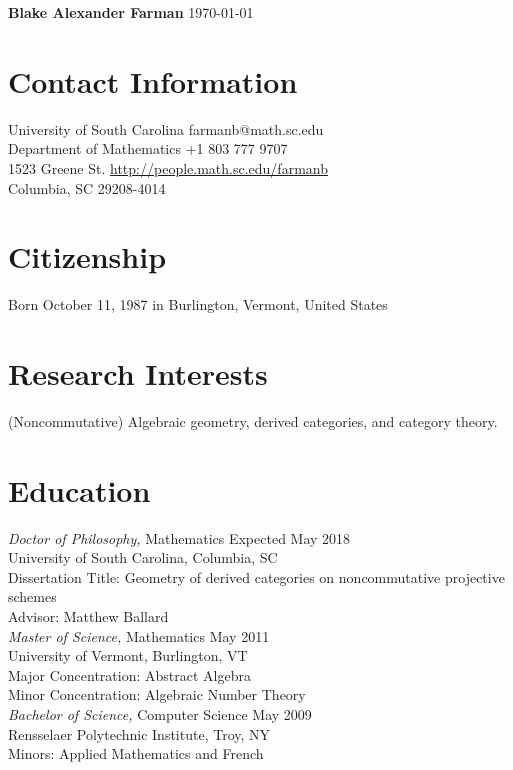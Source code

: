 \documentclass{article}
\begin{document}
\noindent\textbf{\large{Blake Alexander Farman}} \hfill \today\\
\noindent\makebox[\linewidth]{\rule{\textwidth}{0.4pt}}

\section*{Contact Information}
  University of South Carolina \hfill farmanb@math.sc.edu\\
  Department of Mathematics \hfill +1 803 777 9707\\
  1523 Greene St. \hfill \hyperref[http://people.math.sc.edu/farmanb]{http://people.math.sc.edu/farmanb}\\
  Columbia, SC 29208-4014

  \section*{Citizenship}
  Born October 11, 1987 in Burlington, Vermont, United States

  \section*{Research Interests}
  (Noncommutative) Algebraic geometry, derived categories, and category theory.
  
  \section*{Education} 
  \textsl{Doctor of Philosophy,} Mathematics \hfill Expected May 2018\\
  University of South Carolina, Columbia, SC\\
  Dissertation Title: Geometry of derived categories on noncommutative projective schemes\\
  Advisor: Matthew Ballard\\
  
  \noindent
  \textsl{Master of Science,} Mathematics \hfill May 2011\\
  University of Vermont, Burlington, VT\\
  Major Concentration: Abstract Algebra\\
  Minor Concentration: Algebraic Number Theory\\
  
  \noindent\textsl{Bachelor of Science,} Computer Science \hfill May 2009\\
  Rensselaer Polytechnic Institute, Troy, NY\\
  Minors: Applied Mathematics and French
  
\end{document}

